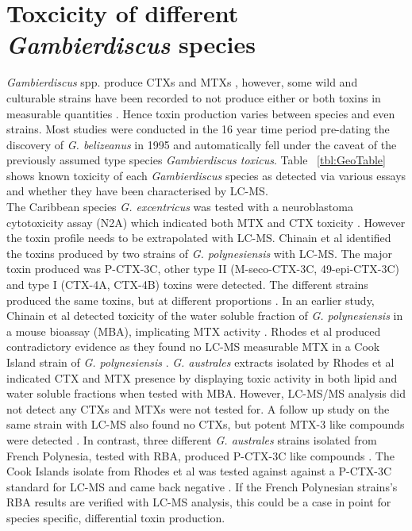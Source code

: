 \documentclass[12pt]{article}
\begin{document}
\section{Toxcicity of different \emph{Gambierdiscus} species}
\emph{Gambierdiscus} spp. produce CTXs and MTXs \cite{murata1990structures,holmes1991strain,satake1993structure,holmes1994purification,satake1996isolation}, however, some wild and culturable strains have been recorded to not produce either or both toxins in measurable quantities \cite{gillespie1985significance,holmes1990toxicity}. Hence toxin production varies between species and even strains. Most studies were conducted in the 16 year time period pre-dating the discovery of \emph{G. belizeanus} in 1995 \cite{faust1995observation} and automatically fell under the caveat of the previously assumed type species \emph{Gambierdiscus toxicus}. Table ~\ref{tbl:GeoTable} shows known toxicity of each \emph{Gambierdiscus} species as detected via various essays and whether they have been characterised by LC-MS. \\
The Caribbean species \emph{G. excentricus} was tested with a neuroblastoma cytotoxicity assay (N2A) which indicated both MTX and CTX toxicity \cite{fraga2011gambierdiscus}. However the toxin profile needs to be extrapolated with LC-MS.
Chinain et al identified the toxins produced by two strains of \emph{G. polynesiensis} with LC-MS. The major toxin produced was P-CTX-3C, other type II (M-seco-CTX-3C, 49-epi-CTX-3C) and type I (CTX-4A, CTX-4B) toxins were detected. The different strains produced the same toxins, but at different proportions \cite{chinain2010growth}. In an earlier study, Chinain et al detected toxicity of the water soluble fraction of \emph{G. polynesiensis} in a mouse bioassay (MBA), implicating MTX activity \cite{chinain1999morphology}. Rhodes et al produced contradictory evidence as they found no LC-MS measurable MTX in a Cook Island strain of \emph{G. polynesiensis} \cite{rhodes2014production}.
\emph{G. australes} extracts isolated by Rhodes et al indicated CTX and MTX presence by displaying toxic activity in both lipid and water soluble fractions when tested with MBA. However, LC-MS/MS analysis did not detect any CTXs and MTXs were not tested for. A follow up study on the same strain with LC-MS also found no CTXs, but potent MTX-3 like compounds were detected \cite{rhodes2014production,rhodes2010toxic}. In contrast, three different \emph{G. australes} strains isolated from French Polynesia, tested with RBA, produced P-CTX-3C like compounds \cite{chinain2010growth}. The Cook Islands isolate from Rhodes et al was tested against against a P-CTX-3C standard for LC-MS and came back negative \cite{rhodes2014production}. If the French Polynesian strains's RBA results are verified with LC-MS analysis, this could be a case in point for species specific, differential toxin production. \\
\end{document}
